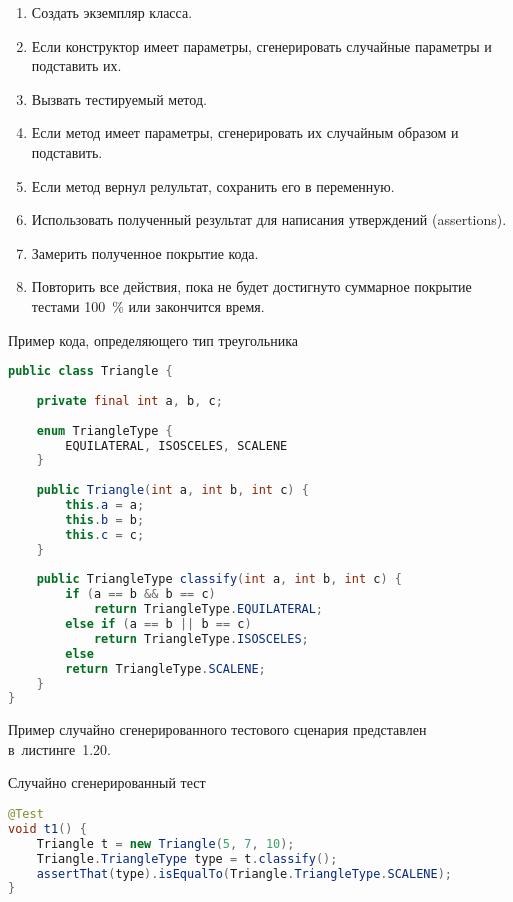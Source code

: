  \begin{enumerate}
 	\item Создать экземпляр класса.
 	\item Если конструктор имеет параметры, сгенерировать случайные параметры и подставить их.
 	\item Вызвать тестируемый метод.
 	\item Если метод имеет параметры, сгенерировать их случайным образом и подставить.
 	\item Если метод вернул релультат, сохранить его в переменную.
 	\item Использовать полученный результат для написания утверждений (assertions).
 	\item Замерить полученное покрытие кода.
 	\item Повторить все действия, пока не будет достигнуто суммарное покрытие тестами 100~\% или закончится время.
 \end{enumerate}

\begin{ListingEnv}[!h]%
	\captiondelim{ } %
	\caption{Пример кода, определяющего тип треугольника}
	\begin{lstlisting}[language={Java}]
public class Triangle {
	
	private final int a, b, c;
	
	enum TriangleType {
		EQUILATERAL, ISOSCELES, SCALENE
	}
	
	public Triangle(int a, int b, int c) {
		this.a = a;
		this.b = b;
		this.c = c;
	}
	
	public TriangleType classify(int a, int b, int c) {
		if (a == b && b == c)
			return TriangleType.EQUILATERAL;
		else if (a == b || b == c)
			return TriangleType.ISOSCELES;
		else
		return TriangleType.SCALENE;
	}
}
	\end{lstlisting}
\end{ListingEnv}%


Пример случайно сгенерированного тестового сценария представлен в~листинге~1.20.

\begin{ListingEnv}[!h]%
	\captiondelim{ } %
	\caption{Случайно сгенерированный тест}
	\begin{lstlisting}[language={Java}]
@Test
void t1() {
	Triangle t = new Triangle(5, 7, 10);
	Triangle.TriangleType type = t.classify();
	assertThat(type).isEqualTo(Triangle.TriangleType.SCALENE);
}
	\end{lstlisting}
\end{ListingEnv}%

